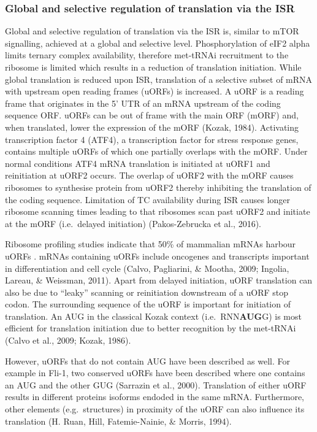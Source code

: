 \documentclass[12pt,openany]{book}
\begin{document}
\subsubsection{Global and selective regulation of translation via the ISR}

Global and selective regulation of translation via the ISR is, similar
to mTOR signalling, achieved at a global and selective level.
Phosphorylation of eIF2 alpha limits ternary complex availability,
therefore met-tRNAi recruitment to the ribosome is limited which results
in a reduction of translation initiation. While global translation is
reduced upon ISR, translation of a selective subset of mRNA with
upstream open reading frames (uORFs) is increased. A uORF is a reading
frame that originates in the 5' UTR of an mRNA upstream of the coding
sequence ORF. uORFs can be out of frame with the main ORF (mORF) and,
when translated, lower the expression of the mORF (Kozak, 1984).
Activating transcription factor 4 (ATF4), a transcription factor for
stress response genes, contains multiple uORFs of which one partially
overlaps with the mORF. Under normal conditions ATF4 mRNA translation is
initiated at uORF1 and reinitiation at uORF2 occurs. The overlap of
uORF2 with the mORF causes ribosomes to synthesise protein from uORF2
thereby inhibiting the translation of the coding sequence. Limitation of
TC availability during ISR causes longer ribosome scanning times leading
to that ribosomes scan past uORF2 and initiate at the mORF (i.e.~delayed
initiation) (Pakos-Zebrucka et al., 2016).

Ribosome profiling studies indicate that 50\% of mammalian mRNAs harbour
uORFs . mRNAs containing uORFs include oncogenes and transcripts
important in differentiation and cell cycle (Calvo, Pagliarini, \&
Mootha, 2009; Ingolia, Lareau, \& Weissman, 2011). Apart from delayed
initiation, uORF translation can also be due to ``leaky'' scanning or
reinitiation downstream of a uORF stop codon. The surrounding sequence
of the uORF is important for initiation of translation. An AUG in the
classical Kozak context (i.e.~RNN\textbf{AUG}G) is most efficient for
translation initiation due to better recognition by the met-tRNAi (Calvo
et al., 2009; Kozak, 1986).

However, uORFs that do not contain AUG have been described as well. For
example in Fli-1, two conserved uORFs have been described where one
contains an AUG and the other GUG (Sarrazin et al., 2000). Translation
of either uORF results in different proteins isoforms endoded in the
same mRNA. Furthermore, other elements (e.g.~structures) in proximity of
the uORF can also influence its translation (H. Ruan, Hill,
Fatemie-Nainie, \& Morris, 1994). \clearpage
\end{document}
